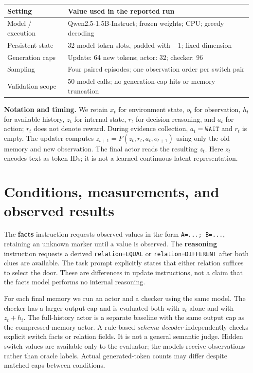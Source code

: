 \documentclass[11pt,letterpaper]{article}
\newcommand{\code}[1]{\texttt{#1}}
\begin{document}
\begin{center}
\small
\begin{tabularx}{\linewidth}{@{}lL@{}}
\toprule
Setting & Value used in the reported run\\
\midrule
Model / execution & Qwen2.5-1.5B-Instruct; frozen weights; CPU; greedy decoding\\
Persistent state & 32 model-token slots, padded with $-1$; fixed dimension\\
Generation caps & Update: 64 new tokens; actor: 32; checker: 96\\
Sampling & Four paired episodes; one observation order per switch pair\\
Validation scope & 50 model calls; no generation-cap hits or memory truncation\\
\bottomrule
\end{tabularx}
\end{center}

\textbf{Notation and timing.} We retain $x_t$ for environment state, $o_t$ for observation,
$h_t$ for available history, $z_t$ for internal state, $r_t$ for decision reasoning,
and $a_t$ for action; $r_t$ does not denote reward. During evidence collection,
$a_t=\code{WAIT}$ and $r_t$ is empty. The updater computes
$z_{t+1}=F(z_t,r_t,a_t,o_{t+1})$ using only the old memory and new observation.
The final actor reads the resulting $z_t$. Here $z_t$ encodes text as token IDs;
it is not a learned continuous latent representation.

\newpage
\section{Conditions, measurements, and observed results}
The \textbf{facts} instruction requests observed values in the form
\code{A=...; B=...}, retaining an unknown marker until a value is observed.
The \textbf{reasoning} instruction requests a derived
\code{relation=EQUAL} or \code{relation=DIFFERENT} after both clues are available.
The task prompt explicitly states that either relation suffices to select the door.
These are differences in update instructions, not a claim that the facts model
performs no internal reasoning.

For each final memory we run an actor and a checker using the same model. The
checker has a larger output cap and is evaluated both with $z_t$ alone and with
$z_t+h_t$. The full-history actor is a separate baseline with the same output cap
as the compressed-memory actor. A rule-based \emph{schema decoder} independently
checks explicit switch facts or relation fields. It is not a general semantic judge.
Hidden switch values are available only to the evaluator; the models receive
observations rather than oracle labels. Actual generated-token counts may differ
despite matched caps between conditions.
\end{document}
